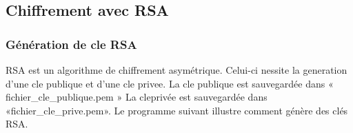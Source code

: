 \documentclass[11pt]{article}
\begin{document}
    \hypertarget{chiffrement-avec-rsa}{%
\subsection{Chiffrement avec RSA}\label{chiffrement-avec-rsa}}

\hypertarget{guxe9nuxe9ration-de-cluxe9ux301-rsa}{%
\subsubsection{Génération de cle
RSA}\label{guxe9nuxe9ration-de-cluxe9ux301-rsa}}

RSA est un algorithme de chiffrement asymétrique. Celui-ci nessite la
generation d'une cle publique et d'une cle privee. La cle publique est
sauvegardée dans « fichier\_cle\_publique.pem » La cleprivée est
sauvegardée dans «fichier\_cle\_prive.pem». Le programme suivant
illustre comment génère des clés RSA.
\end{document}
